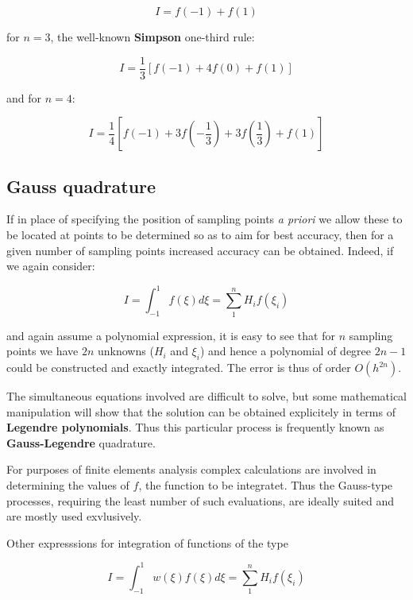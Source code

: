 \documentclass[10pt,b5paper,titlepage]{book}
\begin{document}
\begin{equation}
    I = f(-1) + f(1)
\end{equation}

for $ n = 3 $, the well-known \textbf{Simpson} one-third rule:

\begin{equation}
    I = \frac{1}{3} \left[ f(-1) + 4f(0) + f(1) \right]
\end{equation}

and for $ n = 4 $:

\begin{equation}
    I = \frac{1}{4} \left[f(-1) + 3f(-\frac{1}{3}) + 3f(\frac{1}{3}) + f(1) \right]
\end{equation}


\subsection{Gauss quadrature}

If in place of specifying the position of sampling points \textit{a priori} we
allow these to be located at points to be determined so as to aim for best
accuracy, then for a given number of sampling points increased accuracy can be
obtained. Indeed, if we again consider:

\begin{equation}
    I = \int_{-1}^{1} f(\xi) d\xi = \sum_1^n H_i f(\xi_i)
\end{equation}

and again assume a polynomial expression, it is easy to see that for $ n $ sampling
points we have $ 2n $ unknowns ($H_i$ and $\xi_i$) and hence a polynomial of degree
$ 2n-1 $ could be constructed and exactly integrated. The error is thus of order
$ O(h^{2n}) $.

The simultaneous equations involved are difficult to solve, but some mathematical
manipulation will show that the solution can be obtained explicitely in terms
of \textbf{Legendre polynomials}. Thus this particular process is frequently known
as \textbf{Gauss-Legendre} quadrature.

For purposes of finite elements analysis complex calculations are involved in
determining the values of $ f $, the function to be integratet. Thus the
Gauss-type processes, requiring the least number of such evaluations, are ideally
suited and are mostly used exvlusively.

Other expresssions for integration of functions of the type

\begin{equation}\label{leggaus}
    I = \int_{-1}^{1} w(\xi) f(\xi) d\xi = \sum_{1}^{n} H_i f(\xi_i)
\end{equation}
\end{document}
